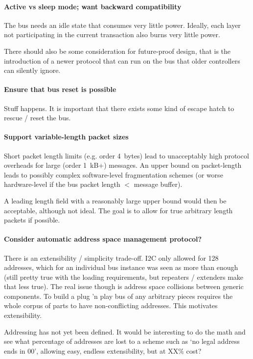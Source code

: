 \paragraph{Active vs sleep mode; want backward compatibility}
The bus needs an idle state that consumes very little power. Ideally, each
layer not participating in the current transaction also burns very little
power.

There should also be some consideration for future-proof design, that is the
introduction of a newer protocol that can run on the bus that older
controllers can silently ignore.

\paragraph{Ensure that bus reset is possible}
Stuff happens. It is important that there exists some kind of escape hatch to
rescue / reset the bus.

\paragraph{Support variable-length packet sizes}
Short packet length limits (e.g. order 4~bytes) lead to unacceptably high
protocol overheads for large (order 1~kB+) messages. An upper bound on
packet-length leads to possibly complex software-level fragmentation schemes
(or worse hardware-level if the bus packet length $<$ message buffer).

A leading length field with a reasonably large upper bound would then be
acceptable, although not ideal. The goal is to allow for true arbitrary length
packets if possible.

\paragraph{Consider automatic address space management protocol?}
There is an extensibility / simplicity trade-off. I2C only allowed for 128
addresses, which for an individual bus instance was seen as more than enough
(still pretty true with the loading requirements, but repeaters / extenders
make that less true). The real issue though is address space collisions
between generic components. To build a plug 'n play bus of any arbitrary
pieces requires the whole corpus of parts to have non-conflicting addresses.
This motivates extensibility.

Addressing has not yet been defined. It would be interesting to do the math
and see what percentage of addresses are lost to a scheme such as `no legal
address ends in 00', allowing easy, endless extensibility, but at XX\% cost?

